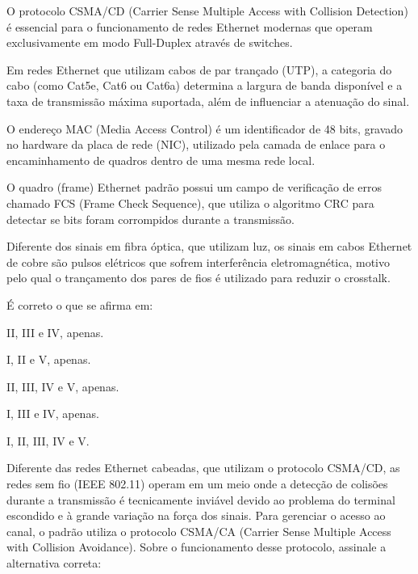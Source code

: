 \documentclass[11pt, addpoints]{modelo/prova2}
\begin{document}
    \begin{statements}
        \item O protocolo CSMA/CD (Carrier Sense Multiple Access with Collision Detection) é essencial para o funcionamento de redes Ethernet modernas que operam exclusivamente em modo Full-Duplex através de switches.
        \item Em redes Ethernet que utilizam cabos de par trançado (UTP), a categoria do cabo (como Cat5e, Cat6 ou Cat6a) determina a largura de banda disponível e a taxa de transmissão máxima suportada, além de influenciar a atenuação do sinal.
        \item O endereço MAC (Media Access Control) é um identificador de 48 bits, gravado no hardware da placa de rede (NIC), utilizado pela camada de enlace para o encaminhamento de quadros dentro de uma mesma rede local.
        \item O quadro (frame) Ethernet padrão possui um campo de verificação de erros chamado FCS (Frame Check Sequence), que utiliza o algoritmo CRC para detectar se bits foram corrompidos durante a transmissão.
        \item Diferente dos sinais em fibra óptica, que utilizam luz, os sinais em cabos Ethernet de cobre são pulsos elétricos que sofrem interferência eletromagnética, motivo pelo qual o trançamento dos pares de fios é utilizado para reduzir o crosstalk.
    \end{statements}
    É correto o que se afirma em:
    \begin{choices}
        \item II, III e IV, apenas.
        \item I, II e V, apenas.
        \item II, III, IV e V, apenas.
        \item I, III e IV, apenas.
        \item I, II, III, IV e V.
    \end{choices}     
\question[0.5] Diferente das redes Ethernet cabeadas, que utilizam o protocolo CSMA/CD, as redes sem fio (IEEE 802.11) operam em um meio onde a detecção de colisões durante a transmissão é tecnicamente inviável devido ao problema do terminal escondido e à grande variação na força dos sinais. Para gerenciar o acesso ao canal, o padrão utiliza o protocolo CSMA/CA (Carrier Sense Multiple Access with Collision Avoidance). Sobre o funcionamento desse protocolo, assinale a alternativa correta:
\end{document}
